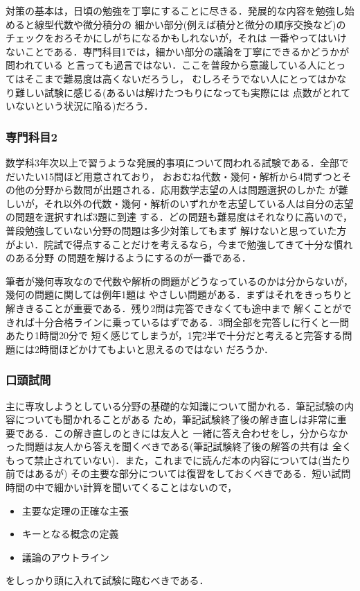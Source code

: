 \documentclass[uplatex]{jsarticle}
\begin{document}
対策の基本は，日頃の勉強を丁寧にすることに尽きる．発展的な内容を勉強し始めると線型代数や微分積分の
細かい部分(例えば積分と微分の順序交換など)のチェックをおろそかにしがちになるかもしれないが，それは
一番やってはいけないことである．専門科目1では，細かい部分の議論を丁寧にできるかどうかが問われている
と言っても過言ではない．ここを普段から意識している人にとってはそこまで難易度は高くないだろうし，
むしろそうでない人にとってはかなり難しい試験に感じる(あるいは解けたつもりになっても実際には
点数がとれていないという状況に陥る)だろう．

\subsubsection*{専門科目2}
数学科3年次以上で習うような発展的事項について問われる試験である．全部でだいたい15問ほど用意されており，
おおむね代数・幾何・解析から4問ずつとその他の分野から数問が出題される．応用数学志望の人は問題選択のしかた
が難しいが，それ以外の代数・幾何・解析のいずれかを志望している人は自分の志望の問題を選択すれば3題に到達
する．どの問題も難易度はそれなりに高いので，普段勉強していない分野の問題は多少対策してもまず
解けないと思っていた方がよい．院試で得点することだけを考えるなら，今まで勉強してきて十分な慣れのある分野
の問題を解けるようにするのが一番である．

筆者が幾何専攻なので代数や解析の問題がどうなっているのかは分からないが，幾何の問題に関しては例年1題は
やさしい問題がある．まずはそれをきっちりと解ききることが重要である．残り2問は完答できなくても途中まで
解くことができれば十分合格ラインに乗っているはずである．3問全部を完答しに行くと一問あたり1時間20分で
短く感じてしまうが，1完2半で十分だと考えると完答する問題には2時間ほどかけてもよいと思えるのではない
だろうか．

\subsubsection*{口頭試問}
主に専攻しようとしている分野の基礎的な知識について聞かれる．筆記試験の内容についても聞かれることがある
ため，筆記試験終了後の解き直しは非常に重要である．この解き直しのときには友人と
一緒に答え合わせをし，分からなかった問題は友人から答えを聞くべきである(筆記試験終了後の解答の共有は
全くもって禁止されていない)．また，これまでに読んだ本の内容については(当たり前ではあるが)
その主要な部分については復習をしておくべきである．短い試問時間の中で細かい計算を聞いてくることはないので，
\begin{itemize}
  \item 主要な定理の正確な主張
  \item キーとなる概念の定義
  \item 議論のアウトライン
\end{itemize}
をしっかり頭に入れて試験に臨むべきである．
\end{document}
